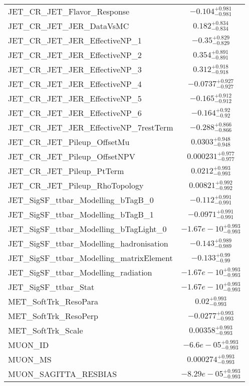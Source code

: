 \begin{tabular}{|l|c|}
JET\_CR\_JET\_Flavor\_Response & $-0.104^{+0.981}_{-0.981}$ \\
JET\_CR\_JET\_JER\_DataVsMC & $0.182^{+0.834}_{-0.834}$ \\
JET\_CR\_JET\_JER\_EffectiveNP\_1 & $-0.35^{+0.829}_{-0.829}$ \\
JET\_CR\_JET\_JER\_EffectiveNP\_2 & $0.354^{+0.891}_{-0.891}$ \\
JET\_CR\_JET\_JER\_EffectiveNP\_3 & $0.312^{+0.918}_{-0.918}$ \\
JET\_CR\_JET\_JER\_EffectiveNP\_4 & $-0.0737^{+0.927}_{-0.927}$ \\
JET\_CR\_JET\_JER\_EffectiveNP\_5 & $-0.165^{+0.912}_{-0.912}$ \\
JET\_CR\_JET\_JER\_EffectiveNP\_6 & $-0.164^{+0.92}_{-0.92}$ \\
JET\_CR\_JET\_JER\_EffectiveNP\_7restTerm & $-0.288^{+0.866}_{-0.866}$ \\
JET\_CR\_JET\_Pileup\_OffsetMu & $0.0303^{+0.948}_{-0.948}$ \\
JET\_CR\_JET\_Pileup\_OffsetNPV & $0.000231^{+0.977}_{-0.977}$ \\
JET\_CR\_JET\_Pileup\_PtTerm & $0.0212^{+0.993}_{-0.993}$ \\
JET\_CR\_JET\_Pileup\_RhoTopology & $0.00821^{+0.992}_{-0.992}$ \\
JET\_SigSF\_ttbar\_Modelling\_bTagB\_0 & $-0.112^{+0.991}_{-0.991}$ \\
JET\_SigSF\_ttbar\_Modelling\_bTagB\_1 & $-0.0971^{+0.991}_{-0.991}$ \\
JET\_SigSF\_ttbar\_Modelling\_bTagLight\_0 & $-1.67e-10^{+0.993}_{-0.993}$ \\
JET\_SigSF\_ttbar\_Modelling\_hadronisation & $-0.143^{+0.989}_{-0.989}$ \\
JET\_SigSF\_ttbar\_Modelling\_matrixElement & $-0.133^{+0.99}_{-0.99}$ \\
JET\_SigSF\_ttbar\_Modelling\_radiation & $-1.67e-10^{+0.993}_{-0.993}$ \\
JET\_SigSF\_ttbar\_Stat & $-1.67e-10^{+0.993}_{-0.993}$ \\
MET\_SoftTrk\_ResoPara & $0.02^{+0.993}_{-0.993}$ \\
MET\_SoftTrk\_ResoPerp & $-0.0277^{+0.993}_{-0.993}$ \\
MET\_SoftTrk\_Scale & $0.00358^{+0.993}_{-0.993}$ \\
MUON\_ID & $-6.6e-05^{+0.993}_{-0.993}$ \\
MUON\_MS & $0.000274^{+0.993}_{-0.993}$ \\
MUON\_SAGITTA\_RESBIAS & $-8.29e-05^{+0.993}_{-0.993}$ \\

\end{tabular}
